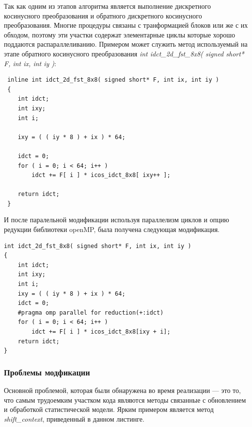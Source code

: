 \documentclass{matmex-diploma-custom}
\begin{document}
Так как одним из этапов алгоритма является выполнение дискретного косинусного преобразования и обратного дискретного косинусного преобразования. Многие процедуры связаны с транформацией блоков или же с их  обходом, поэтому эти участки содержат элементарные циклы которые хорошо поддаются распараллеливанию. Примером может служить метод используемый на этапе обратного косинусного преобразования \emph{int idct\_2d\_fst\_8x8( signed short* F, int ix, int iy )}:

 \begin{lstlisting}
 inline int idct_2d_fst_8x8( signed short* F, int ix, int iy )
 {
 	int idct;
 	int ixy;
 	int i;

 	ixy = ( ( iy * 8 ) + ix ) * 64;

 	idct = 0;
 	for ( i = 0; i < 64; i++ )
 		idct += F[ i ] * icos_idct_8x8[ ixy++ ];

 	return idct;
 }
 \end{lstlisting}

И после паралельной модификации используя параллелизм циклов и опцию редукции библиотеки openMP, была получена следующая модификация.

\begin{lstlisting}
int idct_2d_fst_8x8( signed short* F, int ix, int iy )
{
	int idct;
	int ixy;
	int i;
	ixy = ( ( iy * 8 ) + ix ) * 64;
	idct = 0;
    #pragma omp parallel for reduction(+:idct)
	for ( i = 0; i < 64; i++ )
		idct += F[ i ] * icos_idct_8x8[ixy + i];
	return idct;
}
\end{lstlisting}

\subsubsection{Проблемы модфикации}
Основной проблемой, которая были обнаружена во время реализации --- это то, что самым трудоемким участком кода являются методы связанные с обновлением и обработкой статистической модели. Ярким примером является метод \emph{shift\_context}, приведенный в данном листинге.
\end{document}
